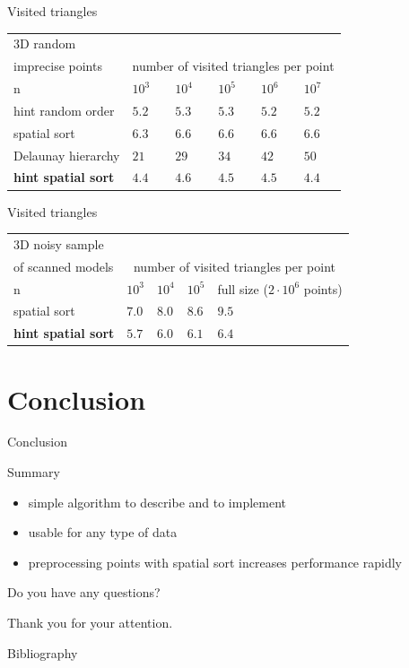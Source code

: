 \documentclass{beamer}
\begin{document}
\begin{frame}{Visited triangles}
\begin{tabular}{|l||l|l|l|l|l|}
\hline
3D random \\
imprecise points & \multicolumn{5}{|c|}{number of visited triangles per point}\\
 \hline \hline
    n & $10^3$ & $10^4$ & $10^5$ & $10^6$ & $10^7$ \\\hline
    hint random order & $5.2 $ & $5.3 $ & $5.3$ & $5.2$ & $5.2$\\\hline
    spatial sort & $6.3$ & $6.6$ & $6.6$ & $6.6$ & $6.6$ \\\hline
    Delaunay hierarchy & $21$ & $29$ & $34$ & $42$ & $50$\\\hline
    \textbf{hint spatial sort} & $4.4$ & $4.6$ & $4.5$ & $4.5$ & $4.4$\\\hline
\end{tabular}
\end{frame}

\begin{frame}{Visited triangles}
\begin{tabular}{|l||l|l|l|l|}
\hline
3D noisy sample \\
of scanned models& \multicolumn{4}{|c|}{number of visited triangles per point}\\
 \hline \hline
    n & $10^3$ & $10^4$ & $10^5$ & full size ($2 \cdot 10^6$ points)\\\hline
    spatial sort & $7.0$ & $8.0$ & $8.6$ & $9.5$\\\hline
    \textbf{hint spatial sort} & $5.7$ & $6.0$ & $6.1$ & $6.4$\\\hline
\end{tabular}
\end{frame}

\section{Conclusion}
\begin{frame}{Conclusion}
\begin{block}{Summary}
\begin{itemize}
\item simple algorithm to describe and to implement
\item usable for any type of data
\item preprocessing points with spatial sort increases performance rapidly
\end{itemize}
\end{block}
\end{frame}

\begin{frame}
\centering
\huge{Do you have any questions?}\\
\pause
\vspace*{1.5cm}
\centerline{\large{Thank you for your attention.}}
\end{frame}

\begin{frame}{Bibliography}
  
\nocite{*}

\end{frame}
\end{document}
